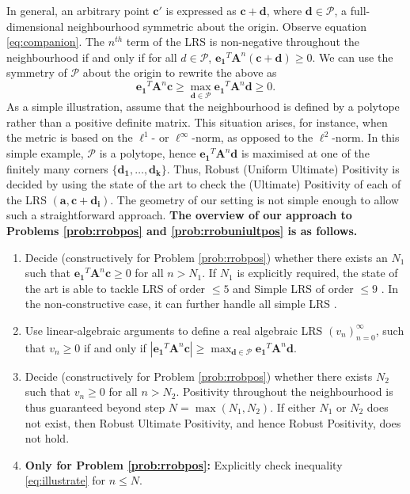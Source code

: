In general, an arbitrary point $\mathbf{c'}$ is expressed as $\mathbf{c} + \mathbf{d}$, where $\mathbf{d} \in \mathcal{P}$, a full-dimensional neighbourhood symmetric about the origin. Observe equation \ref{eq:companion}. The $n^{th}$ term of the LRS is non-negative throughout the neighbourhood if and only if for all $d \in \mathcal{P}$,
$
\mathbf{e_1}^T \mathbf{A}^n (\mathbf{c + d}) \ge 0.
$
We can use the symmetry of $\mathcal{P}$ about the origin to rewrite the above as
\begin{equation}
\label{eq:illustrate}
\mathbf{e_1}^T \mathbf{A}^n \mathbf{c}\ge \max_{\mathbf{d} \in \mathcal{P}} \mathbf{e_1}^T\mathbf{A}^n\mathbf{d} \ge 0.
\end{equation}
As a simple illustration, assume that the neighbourhood is defined by a polytope rather than a positive definite matrix. This situation arises, for instance, when the metric is based on the $\ell^1$- or $\ell^\infty$-norm, as opposed to the $\ell^2$-norm.  In this simple example, $\mathcal{P}$ is a polytope, hence $\mathbf{e_1}^T\mathbf{A}^n\mathbf{d}$ is maximised at one of the finitely many corners $\{\mathbf{d_1}, \dots, \mathbf{d_k}\}$. Thus, Robust (Uniform Ultimate) Positivity is decided by using the state of the art \cite{joeljames3} to check the (Ultimate) Positivity of each of the LRS $(\mathbf{a}, \mathbf{c+d_i})$. The geometry of our setting is not simple enough to allow such a straightforward approach.
\textbf{The overview of our approach to Problems \ref{prob:rrobpos} and \ref{prob:rrobuniultpos} is as follows.}
\begin{enumerate}
\item Decide (constructively for Problem \ref{prob:rrobpos}) whether there exists an $N_1$ such that $\mathbf{e_1}^T \mathbf{A}^n \mathbf{c} \ge 0$ for all $n > N_1$. If $N_1$ is explicitly required, the state of the art is able to tackle LRS of order $\le 5$ \cite{joeljames3} and Simple LRS of order $\le 9$ \cite{ouaknine2014positivity}. In the non-constructive case, it can further handle all simple LRS \cite{ouaknine2014ultimate}.
\item Use linear-algebraic arguments to define a real algebraic LRS $(v_n)_{n=0}^\infty$, such that $v_n \ge 0$ if and only if $|\mathbf{e_1}^T \mathbf{A}^n \mathbf{c}|\ge \max_{\mathbf{d} \in \mathcal{P}} \mathbf{e_1}^T\mathbf{A}^n\mathbf{d}$.
\item Decide (constructively for Problem \ref{prob:rrobpos}) whether there exists $N_2$ such that $v_n \ge 0$ for all $n > N_2$. Positivity throughout the neighbourhood is thus guaranteed beyond step $N = \max(N_1, N_2)$. If either $N_1$ or $N_2$ does not exist, then Robust Ultimate Positivity, and hence Robust Positivity, does not hold.
\item \textbf{Only for Problem \ref{prob:rrobpos}:} Explicitly check inequality \ref{eq:illustrate} for $n \le N$.
\end{enumerate}

